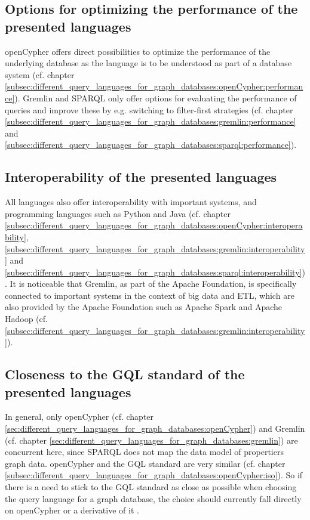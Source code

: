 \subsection{Options for optimizing the performance of the presented languages}
\label{subsec:conclusion:executive_summary:performance}
openCypher offers direct possibilities to optimize the performance of the underlying database 
as the language is to be understood as part of a 
database system 
(cf. chapter \ref{subsec:different_query_languages_for_graph_databases:openCypher:performance}).
Gremlin and SPARQL only offer options for evaluating the performance of queries and 
improve these by e.g. switching to 
filter-first 
strategies (cf. chapter \ref{subsec:different_query_languages_for_graph_databases:gremlin:performance} 
and \ref{subsec:different_query_languages_for_graph_databases:sparql:performance}).
\subsection{Interoperability of the presented languages}
\label{subsec:conclusion:executive_summary:interoperability}
All languages also offer interoperability with important systems,
and programming languages such as Python and Java 
(cf. chapter \ref{subsec:different_query_languages_for_graph_databases:openCypher:interoperability},
\ref{subsec:different_query_languages_for_graph_databases:gremlin:interoperability} and 
\ref{subsec:different_query_languages_for_graph_databases:sparql:interoperability}).
It is noticeable that Gremlin, as part of the Apache Foundation, is specifically connected to important
systems in the context of big data and ETL, which are also provided by the Apache Foundation
such as Apache Spark and Apache Hadoop (cf. \ref{subsec:different_query_languages_for_graph_databases:gremlin:interoperability}).
\subsection{Closeness to the GQL standard of the presented languages}
\label{subsec:conclusion:executive_summary:iso}
In general, only openCypher (cf. chapter \ref{sec:different_query_languages_for_graph_databases:openCypher}) 
and 
Gremlin (cf. chapter \ref{sec:different_query_languages_for_graph_databases:gremlin})
are concurrent here, since SPARQL does not map the 
data model of propertiers graph data. 
openCypher and the GQL standard 
are very similar (cf. chapter \ref{subsec:different_query_languages_for_graph_databases:openCypher:iso}). 
So if there is a need to stick to the GQL standard as close as possible 
when choosing the query language for a graph database, the choice should 
currently fall directly on openCypher or a derivative 
of it \citep{noauthor_opencypher_2024} \citep{hare_isoiec_2024}.

